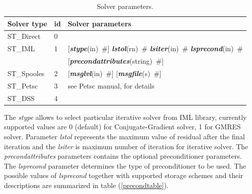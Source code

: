 \documentclass[a4paper]{article}
\newcommand{\param}[1]{{\em #1}}
\newcommand{\keywordnotype}[1]{\mbox{{\it{\bf{#1}}}}}
\newcommand{\keyword}[2]{\mbox{{\keywordnotype{#1}\tiny (#2)}}}
\newcommand{\field}[2]{\mbox{\keyword{#1}{#2}~\#}}
\newcommand{\optField}[2]{\mbox{[\field{#1}{#2}]}}
\begin{document}
\begin{table}[h]                                                                
\begin{center}                                                                  
\begin{tabular}{|l|l|l|}                                                      
\hline                                                                          
Solver type & id & Solver parameters \\
\hline
ST\_Direct  &0&\\
ST\_IML     &1& \optField{stype}{in} \field{lstol}{rn} \field{lsiter}{in}
\field{lsprecond}{in}\\
                  & &  \optField{precondattributes}{string}\\

ST\_Spooles &2&  \optField{msglvl}{in} \optField{msgfile}{s}\\
ST\_Petsc   &3& see Petsc manual, for details\footnotemark\\
ST\_DSS     &4& \\ 
\hline
\end{tabular}                                                                   
\caption{Solver parameters.}                
\label{sparsesolverparams}                                                         
\end{center}                                                                    
\end{table}      
The \param{stype} allows to select particular iterative solver from IML library, currently supported values are 0 (default) for Conjugate-Gradient solver, 1 for GMRES solver. Parameter \param{lstol} represents the maximum value of residual after the
final iteration and the \param{lsiter} is maximum number of iteration  for
iterative solver. 
The \param{precondattributes} parameters contains the optional
preconditioner parameters.
The \param{lsprecond} parameter determines the type of preconditioner to be
used. The possible values of \param{lsprecond} together with supported
storage schemes and their descriptions are summarized in table
(\ref{precondtable}).
\end{document}
